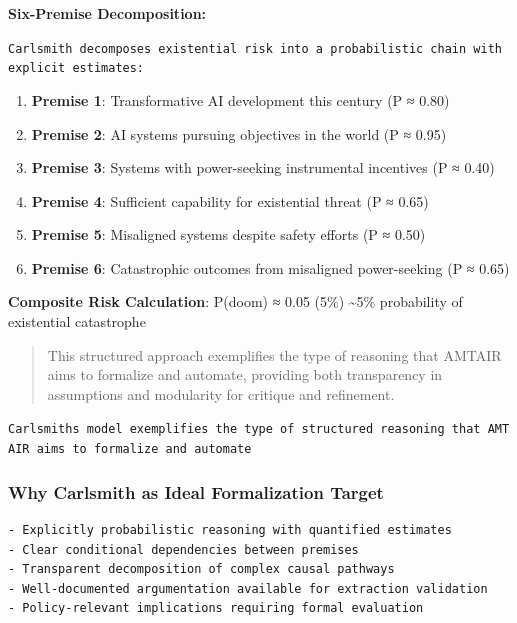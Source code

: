 \documentclass[
  11pt,
  letterpaper,
]{book}
\providecommand{\tightlist}{%
  \setlength{\itemsep}{0pt}\setlength{\parskip}{0pt}}
\begin{document}
\textbf{Six-Premise Decomposition:}

\texttt{Carlsmith\ decomposes\ existential\ risk\ into\ a\ probabilistic\ chain\ with\ explicit\ estimates:}

\begin{enumerate}
\def\labelenumi{\arabic{enumi}.}
\tightlist
\item
  \textbf{Premise 1}: Transformative AI development this century (P ≈
  0.80)
\item
  \textbf{Premise 2}: AI systems pursuing objectives in the world (P ≈
  0.95)
\item
  \textbf{Premise 3}: Systems with power-seeking instrumental incentives
  (P ≈ 0.40)
\item
  \textbf{Premise 4}: Sufficient capability for existential threat (P ≈
  0.65)
\item
  \textbf{Premise 5}: Misaligned systems despite safety efforts (P ≈
  0.50)
\item
  \textbf{Premise 6}: Catastrophic outcomes from misaligned
  power-seeking (P ≈ 0.65)
\end{enumerate}

\textbf{Composite Risk Calculation}: P(doom) ≈ 0.05 (5\%)
\textasciitilde5\% probability of existential catastrophe

\begin{quote}
This structured approach exemplifies the type of reasoning that AMTAIR
aims to formalize and automate, providing both transparency in
assumptions and modularity for critique and refinement.
\end{quote}

\texttt{Carlsmith\textquotesingle{}s\ model\ exemplifies\ the\ type\ of\ structured\ reasoning\ that\ AMTAIR\ aims\ to\ formalize\ and\ automate}

\subsubsection{Why Carlsmith as Ideal Formalization
Target}\label{sec-carlsmith-ideal}

\begin{verbatim}
- Explicitly probabilistic reasoning with quantified estimates
- Clear conditional dependencies between premises  
- Transparent decomposition of complex causal pathways
- Well-documented argumentation available for extraction validation
- Policy-relevant implications requiring formal evaluation
\end{verbatim}
\end{document}
